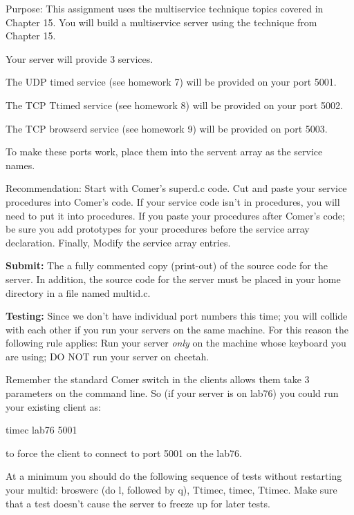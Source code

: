 

\parindent 0pt

Purpose: This assignment uses the multiservice technique
topics covered in Chapter 15.
You will build a multiservice server
using the technique from Chapter 15.

Your server will provide 3 services.

The UDP {\ltt{}timed} service (see homework 7) will be provided
on your port 5001.

The TCP {\ltt{}Ttimed} service (see homework 8) will be provided
on your port 5002.

The TCP {\ltt{}browserd} service (see homework 9) will be provided
on port 5003.

To make these ports work, place them into the {\ltt{}servent} array
as the service names.

Recommendation: Start with Comer's {\ltt{}superd.c} code.
Cut and paste your service procedures into Comer's code.
If your service code isn't in procedures, you will need to put it 
into procedures.
If you paste your procedures after Comer's code; be sure you
add prototypes for your procedures before the service array declaration.
Finally, Modify the service array entries.

{\bf Submit:} The a fully commented copy (print-out) of the source code for the 
server.
In addition,
the source code for the server must be placed in your home directory
in a file named {\ltt{}multid.c}.

{\bf Testing:}
Since we don't have individual port numbers this time; you will
collide with each other if you run your servers on the same machine.
For this reason the following rule applies:
Run your server {\it only} on the machine whose keyboard you are using;
DO NOT run your server on {\ltt{}cheetah}.

Remember the standard Comer switch in the clients allows them
take 3 parameters on the command line.
So (if your server is on {\ltt{}lab76}) you could run your existing client as:

{\ltt{}timec lab76 5001}

to force the client to connect to port 5001 on the lab76. 

At a  minimum you should do the following sequence of tests
without restarting your multid: broswerc (do l, followed by q), Ttimec,
timec, Ttimec.
Make sure that a test doesn't cause the server to freeze up for later tests.

\bye
